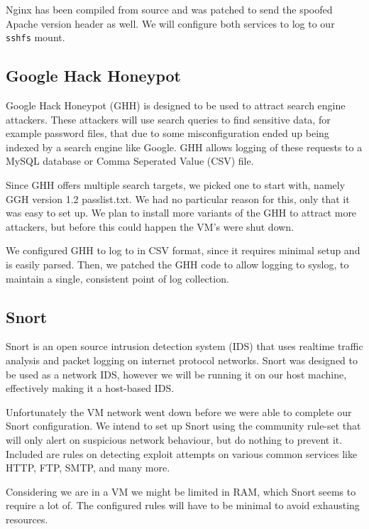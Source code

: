 \documentclass[11pt]{article} %
\begin{document}
Nginx has been compiled from source and was patched to send the spoofed Apache version header as well.
We will configure both services to log to our \verb|sshfs| mount.

\subsection{Google Hack Honeypot}
Google Hack Honeypot (GHH) is designed to be used to attract search engine attackers. 
These attackers will use search queries to find sensitive data, for example password files, that due to some misconfiguration ended up being indexed by a search engine like Google.
GHH allows logging of these requests to a MySQL database or Comma Seperated Value (CSV) file.

Since GHH offers multiple search targets, we picked one to start with, namely GGH version 1.2 passlist.txt.
We had no particular reason for this, only that it was easy to set up. 
We plan to install more variants of the GHH to attract more attackers, but before this could happen the VM's were shut down.

We configured GHH to log to in CSV format, since it requires minimal setup and is easily parsed.
Then, we patched the GHH code to allow logging to syslog, to maintain a single, consistent point of log collection.

\subsection{Snort}
Snort is an open source intrusion detection system (IDS) that uses realtime traffic analysis and packet logging on internet protocol networks.
Snort was designed to be used as a network IDS, however we will be running it on our host machine, effectively making it a host-based IDS.

Unfortunately the VM network went down before we were able to complete our Snort configuration.
We intend to set up Snort using the community rule-set that will only alert on suspicious network behaviour, but do nothing to prevent it. 
Included are rules on detecting exploit attempts on various common services like HTTP, FTP, SMTP, and many more.

Considering we are in a VM we might be limited in RAM, which Snort seems to require a lot of.
The configured rules will have to be minimal to avoid exhausting resources.
\end{document}
